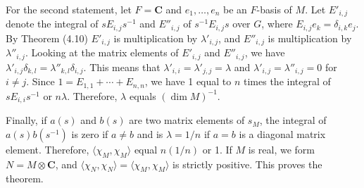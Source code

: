 For the second statement, let $F = \mathbf{C}$ and $e_1, \ldots, e_n$ be an $F$-basis of $M$. Let $E'_{i,j}$ denote the integral of $sE_{i,j}s^{-1}$ and $E''_{i,j}$ of $s^{-1}E_{i,j}s$ over $G$, where $E_{i,j}e_k = \delta_{i,k}e_j$. By Theorem (4.10) $E'_{i,j}$ is multiplication by $\lambda'_{i,j}$, and $E''_{i,j}$ is multiplication by $\lambda''_{i,j}$. Looking at the matrix elements of $E'_{i,j}$ and $E''_{i,j}$, we have $\lambda'_{i,j}\delta_{k,l} = \lambda''_{k,l}\delta_{i,j}$. This means that $\lambda'_{i,i} = \lambda'_{j,j} = \lambda$ and $\lambda'_{i,j} = \lambda''_{i,j} = 0$ for $i \neq j$. Since $1 = E_{1,1} + \cdots + E_{n,n}$, we have 1 equal to $n$ times the integral of $sE_{i,i}s^{-1}$ or $n\lambda$. Therefore, $\lambda$ equals $(\dim M)^{-1}$.

Finally, if $a(s)$ and $b(s)$ are two matrix elements of $s_M$, the integral of $a(s)b(s^{-1})$ is zero if $a \neq b$ and is $\lambda = 1/n$ if $a = b$ is a diagonal matrix element. Therefore, $\langle \chi_M, \chi_M \rangle$ equal $n(1/n)$ or 1. If $M$ is real, we form $N = M \otimes \mathbf{C}$, and $\langle \chi_N, \chi_N \rangle = \langle \chi_M, \chi_M \rangle$ is strictly positive. This proves the theorem.
